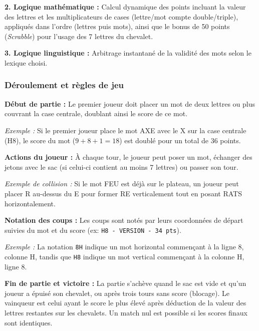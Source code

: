 \documentclass[a4paper]{article}
\begin{document}
\vspace{1\baselineskip}
\hangindent=1.5cm
\textbf{2. Logique mathématique :} Calcul dynamique des points incluant la valeur des lettres et les multiplicateurs de cases (lettre/mot compte double/triple), appliqués dans l'ordre (lettres puis mots), ainsi que le bonus de 50 points (\textit{Scrabble}) pour l'usage des 7 lettres du chevalet.

\vspace{1\baselineskip}
\hangindent=1.5cm
\textbf{3. Logique linguistique :} Arbitrage instantané de la validité des mots selon le lexique choisi.

\subsubsection*{Déroulement et règles de jeu}
\hangindent=0.8mm
\textbf{Début de partie :} Le premier joueur doit placer un mot de deux lettres ou plus couvrant la case centrale, doublant ainsi le score de ce mot.

\hangindent=1.5cm
\textit{Exemple :} Si le premier joueur place le mot \og AXE \fg{} avec le \og X \fg{} sur la case centrale (H8), le score du mot ($9 + 8 + 1 = 18$) est doublé pour un total de 36 points.

\vspace{1\baselineskip}
\hangindent=0.8mm
\textbf{Actions du joueur :} À chaque tour, le joueur peut poser un mot, échanger des jetons avec le sac (si celui-ci contient au moins 7 lettres) ou passer son tour.

\hangindent=1.5cm
\textit{Exemple de collision :} Si le mot \og FEU \fg{} est déjà sur le plateau, un joueur peut placer \og R \fg{} au-dessus du \og E \fg{} pour former \og RE \fg{} verticalement tout en posant \og RATS \fg{} horizontalement.

\vspace{1\baselineskip}
\hangindent=0.8mm
\textbf{Notation des coups :} Les coups sont notés par leurs coordonnées de départ suivies du mot et du score (ex: \texttt{H8 - VERSION - 34 pts}).

\hangindent=1.5cm
\textit{Exemple :} La notation \og \texttt{8H} \fg{} indique un mot horizontal commençant à la ligne 8, colonne H, tandis que \og \texttt{H8} \fg{} indique un mot vertical commençant à la colonne H, ligne 8.

\vspace{1\baselineskip}
\hangindent=0.8mm
\textbf{Fin de partie et victoire :} La partie s'achève quand le sac est vide et qu'un joueur a épuisé son chevalet, ou après trois tours sans score (blocage). Le vainqueur est celui ayant le score le plus élevé après déduction de la valeur des lettres restantes sur les chevalets. Un match nul est possible si les scores finaux sont identiques.
\end{document}
